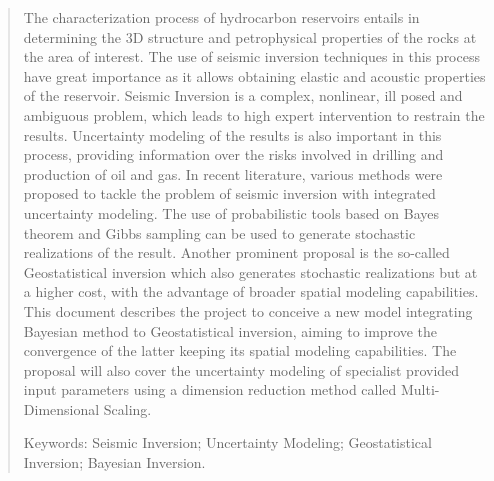 \begin{quotation}

\noindent 

The characterization process of hydrocarbon reservoirs entails in determining
the 3D structure and petrophysical properties of the rocks at the area of
interest. The use of seismic inversion techniques in this process have great
importance as it allows obtaining elastic and acoustic properties of the
reservoir. Seismic Inversion is a complex, nonlinear, ill posed and ambiguous
problem, which leads to high expert intervention to restrain the results.
Uncertainty modeling of the results is also important in this process, providing
information over the risks involved in drilling and production of oil and gas.
In recent literature, various methods were proposed to tackle the problem of
seismic inversion with integrated uncertainty modeling. The use of probabilistic
tools based on Bayes theorem and Gibbs sampling can be used to generate
stochastic realizations of the result. Another prominent proposal is the
so-called Geostatistical inversion which also generates stochastic realizations
but at a higher cost, with the advantage of broader spatial modeling
capabilities. This document describes the project to conceive a new model
integrating Bayesian method to Geostatistical inversion, aiming to improve the
convergence of the latter keeping its spatial modeling capabilities. The
proposal will also cover the uncertainty modeling of specialist provided input
parameters using a dimension reduction method called Multi-Dimensional Scaling.



\vspace*{0.5cm}

\noindent Keywords: Seismic Inversion; Uncertainty Modeling; Geostatistical
Inversion; Bayesian Inversion.

\end{quotation}

\null


